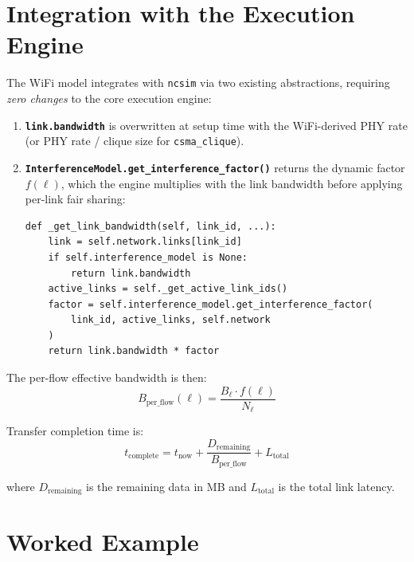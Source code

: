 \documentclass[11pt,letterpaper]{article}
\newcommand{\ncsim}{\texttt{ncsim}}
\begin{document}
\section{Integration with the Execution Engine}
\label{sec:integration}

The WiFi model integrates with \ncsim{} via two existing abstractions,
requiring \emph{zero changes} to the core execution engine:

\begin{enumerate}
\item \textbf{\texttt{link.bandwidth}} is overwritten at setup time with the
  WiFi-derived PHY rate (or PHY rate / clique size for \texttt{csma\_clique}).

\item \textbf{\texttt{InterferenceModel.get\_interference\_factor()}} returns
  the dynamic factor $f(\ell)$, which the engine multiplies with the link
  bandwidth before applying per-link fair sharing:

\begin{lstlisting}[caption={Engine bandwidth computation (execution\_engine.py).}]
def _get_link_bandwidth(self, link_id, ...):
    link = self.network.links[link_id]
    if self.interference_model is None:
        return link.bandwidth
    active_links = self._get_active_link_ids()
    factor = self.interference_model.get_interference_factor(
        link_id, active_links, self.network
    )
    return link.bandwidth * factor
\end{lstlisting}
\end{enumerate}

The per-flow effective bandwidth is then:
\begin{equation}
B_\text{per\_flow}(\ell) = \frac{B_\ell \cdot f(\ell)}{N_\ell}
\end{equation}

Transfer completion time is:
\begin{equation}
t_\text{complete} = t_\text{now} + \frac{D_\text{remaining}}{B_\text{per\_flow}} + L_\text{total}
\end{equation}

where $D_\text{remaining}$ is the remaining data in MB and $L_\text{total}$
is the total link latency.

\section{Worked Example}
\label{sec:example}
\end{document}
